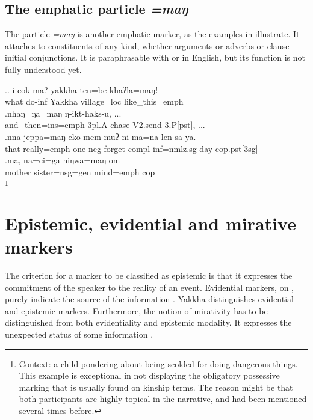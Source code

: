 \subsection{The emphatic particle \emph{=maŋ}}

 The particle \emph{=maŋ} is another emphatic marker, as the examples in \Next illustrate. It attaches to constituents of any kind, whether arguments or adverbs or clause-initial conjunctions. It is paraphrasable with  or  in English, but its  function is not fully understood yet.
 
\ex.\ag. i cok-ma? yakkha ten=be khaʔla=maŋǃ\\
what do{\sc -inf} Yakkha village{\sc =loc} like\_this{\sc =emph}\\
  \bg.nhaŋ=ŋa=maŋ ŋ-ikt-haks-u, ...\\
  and\_then{\sc =ins=emph} {\sc 3pl.A-}chase{\sc -V2.send-3.P[pst]}, ...\\
 \bg.nna  jeppa=maŋ   eko mem-muʔ-ni-ma=na                         len sa-ya.\\
that really{\sc =emph} one {\sc neg-}forget{\sc -compl-inf=nmlz.sg} day {\sc cop.pst[3sg]}\\
 
 \bg.ma,     na=ci=ga                 niŋwa=maŋ   om \\
mother sister{\sc =nsg=gen} mind{\sc =emph} {\sc cop} \\
\footnote{Context: a child pondering about being scolded for doing dangerous things. This example is exceptional in not displaying the obligatory possessive marking that is usually found on kinship terms. The reason might be that both participants are highly topical in the narrative, and had been mentioned several times before.}  
 

	
\section{Epistemic, evidential and mirative markers}\label{ptcl-evid}

The criterion for a marker to be classified as epistemic is that it expresses the commitment of the speaker to the reality of an event. Evidential markers, on , purely indicate the source of the information \citep{Cornillie2009_Evidentiality}. Yakkha distinguishes evidential and epistemic markers. Furthermore, the notion of mirativity has to be distinguished from both evidentiality and epistemic modality. It expresses the unexpected status of some information \citep{DeLancey1997Mirativity}.  

